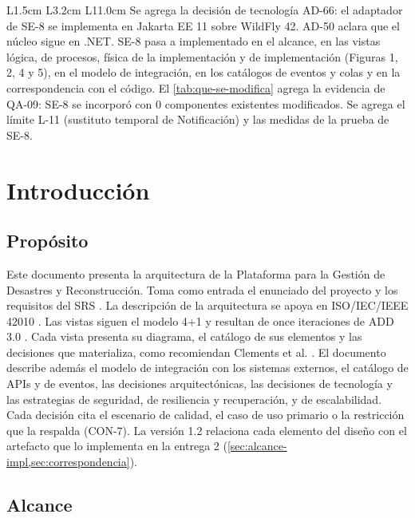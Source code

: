\documentclass[11pt,letterpaper]{article}
\begin{document}
\begin{tabular}{L{1.5cm} L{3.2cm} L{11.0cm}}
Se agrega la decisión de tecnología AD-66: el adaptador de SE-8 se implementa en Jakarta EE 11 sobre
WildFly 42. AD-50 aclara que el núcleo sigue en .NET.
SE-8 pasa a implementado en el alcance, en las vistas lógica, de procesos, física de la
implementación y de implementación (Figuras 1, 2, 4 y 5), en el modelo de integración, en los
catálogos de eventos y colas y en la correspondencia con el código.
El \cref{tab:que-se-modifica} agrega la evidencia de QA-09: SE-8 se incorporó con 0 componentes
existentes modificados.
Se agrega el límite L-11 (sustituto temporal de Notificación) y las medidas de la prueba de SE-8. \\
\bottomrule
\end{tabular}

\tableofcontents
\newpage

\section{Introducción}
\label{sec:introduccion}

\subsection{Propósito}

Este documento presenta la arquitectura de la Plataforma para la Gestión de Desastres y
Reconstrucción. Toma como entrada el enunciado del proyecto \cite{enunciado} y los requisitos del SRS
\cite{srs}. La descripción de la arquitectura se apoya en ISO/IEC/IEEE 42010 \cite{iso42010}. Las vistas
siguen el modelo 4+1 \cite{kruchten} y resultan de once iteraciones de ADD 3.0 \cite{cervantes}. Cada
vista presenta su diagrama, el catálogo de sus elementos y las decisiones que materializa, como
recomiendan Clements et al. \cite{clements}. El documento
describe además el modelo de integración con los sistemas externos, el catálogo de APIs y de
eventos, las decisiones arquitectónicas, las decisiones de tecnología y las estrategias de
seguridad, de resiliencia y recuperación, y de escalabilidad. Cada decisión cita el escenario de
calidad, el caso de uso primario o la restricción que la respalda (CON-7). La versión 1.2 relaciona
cada elemento del diseño con el artefacto que lo implementa en la entrega 2
(\cref{sec:alcance-impl,sec:correspondencia}).

\subsection{Alcance}
\label{sec:alcance-sad}
\end{document}
